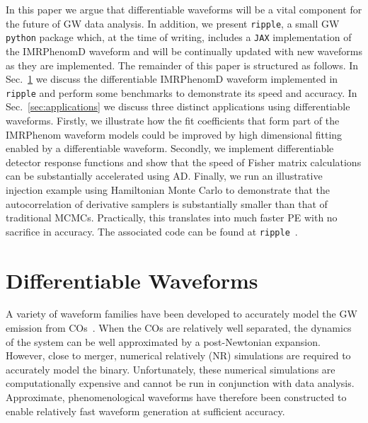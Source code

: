 \documentclass[twocolumn]{aastex631}
\newcommand{\jax}{\texttt{JAX}\xspace}
\newcommand{\ripple}{\texttt{ripple}\xspace}
\newcommand{\AZ}[1]{{\color{Burnt}[AZ: #1]}}
\begin{document}
In this paper we argue that differentiable waveforms will be a vital component for the future of GW data analysis.
In addition, we present \ripple, a small GW \texttt{python} package which, at the time of writing, includes a \jax implementation of the IMRPhenomD waveform and will be continually updated with new waveforms as they are implemented.
The remainder of this paper is structured as follows. 
In Sec.~\ref{sec:waveforms} we discuss the differentiable IMRPhenomD waveform implemented in \ripple and perform some benchmarks to demonstrate its speed and accuracy. 
In Sec.~\ref{sec:applications} we discuss three distinct applications using differentiable waveforms. 
Firstly, we illustrate how the fit coefficients that form part of the IMRPhenom waveform models could be improved by high dimensional fitting enabled by a differentiable waveform. 
Secondly, we implement differentiable detector response functions and show that the speed of Fisher matrix calculations can be substantially accelerated using AD.
Finally, we run an illustrative injection example using Hamiltonian Monte Carlo to demonstrate that the autocorrelation of derivative samplers is substantially smaller than that of traditional MCMCs.
Practically, this translates into much faster PE with no sacrifice in accuracy.
The associated code can be found at \ripple~\citep{ripple}.

\section{Differentiable Waveforms}
\label{sec:waveforms}

A variety of waveform families have been developed to accurately model the GW emission from COs~\citep{Schmidtreview}. 
When the COs are relatively well separated, the dynamics of the system can be well approximated by a post-Newtonian expansion.
However, close to merger, numerical relatively (NR) simulations are required to accurately model the binary.
Unfortunately, these numerical simulations are computationally expensive and cannot be run in conjunction with data analysis.
Approximate, phenomenological waveforms have therefore been constructed to enable relatively fast waveform generation at sufficient accuracy.
\end{document}
